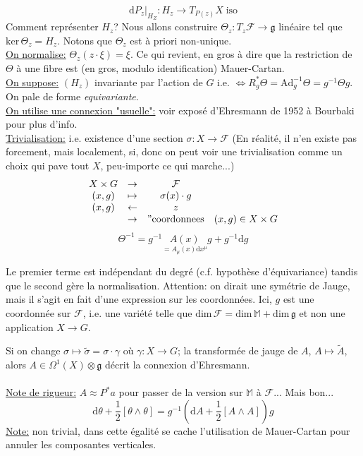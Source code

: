 \documentclass[a4paper,11pt]{article}
\renewcommand{\d}{{\mathrm{d}}}
\begin{document}
$$\d P_z |_{H_Z} : H_z \to T_{P(z)}X \; \mathrm{iso}$$
Comment représenter $H_z$? Nous allons construire $\Theta_z: T_z \mathcal{F} \to \mathfrak{g}$ linéaire tel que $\mathrm{ker}\, \Theta_z = H_z$. Notons que $\Theta_z$ est à priori non-unique.\\
\underline{On normalise:} $\Theta_z (z\cdot \xi) = \xi$. Ce qui revient, en gros à dire que la restriction de $\Theta$ à une fibre est (en gros, modulo identification) Mauer-Cartan.\\
\underline{On suppose:} $(H_z)$ invariante par l'action de $G$ i.e. $\iff R_g^* \Theta = \mathrm{Ad}_g^{-1} \Theta = g^{-1} \Theta g$. On pale de forme \emph{equivariante}.\\
\underline{On utilise une connexion "usuelle":} voir exposé d'Ehresmann de 1952 à Bourbaki pour plus d'info.\\
\underline{Trivialisation:} i.e. existence d'une section $\sigma: X \to \mathcal{F}$ (En réalité, il n'en existe pas forcement, mais localement, si, donc on peut voir une trivialisation comme un choix qui pave tout $X$, peu-importe ce qui marche...)
$$\begin{matrix}
X\times G & \to & \mathcal{F}&\\
(x,g) & \mapsto & \sigma(x)\cdot g&\\
(x,g) & \leftarrow & z&\\
&\to & "\mathrm{coordonnees}& (x,g)\in X\times G
\end{matrix}
$$
$$\Theta^{-1} = g^{-1} \underset{=A_\mu(x)\d x^\mu}{A(x)} g + g^{-1} \d g$$

Le premier terme est indépendant du degré (c.f. hypothèse d'équivariance) tandis que le second gère la normalisation. Attention: on dirait une symétrie de Jauge, mais il s'agit en fait d'une expression sur les coordonnées. Ici, $g$ est une coordonnée sur $\mathcal{F}$, i.e. une variété telle que $\mathrm{dim}\,\mathcal{F} =\mathrm{dim}\,\mathbb{M}+\mathrm{dim}\,\mathfrak{g}$ et non une application $X \to G$.

Si on change $\sigma \mapsto \tilde \sigma = \sigma \cdot \gamma$ où $\gamma: X \to G$; la transformée de jauge de $A$, $A \mapsto \tilde A$, alors $A\in \Omega^1(X)\otimes \mathfrak{g}$ décrit la connexion d'Ehresmann.\\ \\
\underline{Note de rigueur:} $A\approx P^* a$ pour passer de la version sur $\mathbb{M}$ à $\mathcal{F}$... Mais bon...
$$\d \theta + \frac{1}{2}[\theta\wedge\theta] = g^{-1} \left(\d A +\frac{1}{2}[A\wedge A]\right)g$$
\underline{Note:} non trivial, dans cette égalité se cache l'utilisation de Mauer-Cartan pour annuler les composantes verticales.
\end{document}
